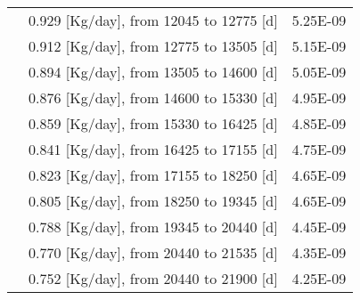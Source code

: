 \begin{table}[ht!]
\begin{tabularx}{\textwidth}{|p{1.5cm}|b|p{1.9cm}|}
		& 0.929  [Kg/day], from 12045 to 12775 [d] &	5.25E-09 \\
		&  0.912   [Kg/day], from 12775 to 13505 [d] &	5.15E-09 \\
		&   0.894  [Kg/day], from 13505 to 14600 [d] &	5.05E-09 \\
		&  0.876 [Kg/day], from 14600 to 15330 [d] &	4.95E-09 \\
		& 0.859   [Kg/day], from 15330 to 16425 [d] &	4.85E-09 \\
		&  0.841 [Kg/day], from 16425 to 17155 [d] &	4.75E-09 \\
		&  0.823 [Kg/day], from 17155 to 18250 [d] &	4.65E-09 \\
		&  0.805 [Kg/day], from 18250 to 19345 [d] &	4.65E-09 \\
		& 0.788  [Kg/day], from 19345 to 20440 [d] &	4.45E-09 \\
		&  0.770 [Kg/day], from 20440 to 21535 [d] &	4.35E-09 \\
		& 0.752 [Kg/day], from 20440 to 21900 [d] &	4.25E-09 \\
		\hline
	\end{tabularx}
	\label{tab:table10}
\end{table}	
